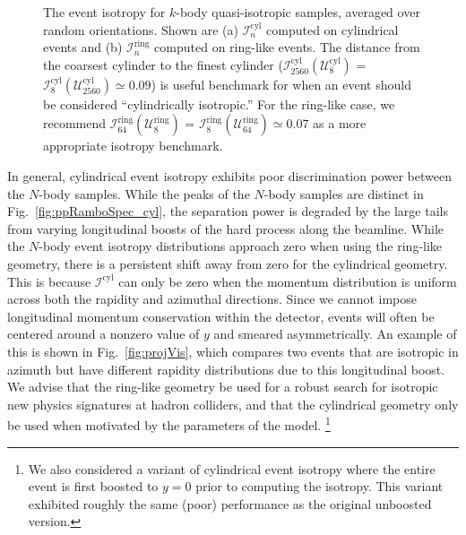 \documentclass[letterpaper,11pt]{article}
\newcommand{\iso}[2]{\mathcal{I}^\text{#1}_{#2}}
\DeclareRobustCommand{\Fig}[1]{Fig.~\ref{#1}}
\begin{document}
\begin{figure}[p]
%
\centering
     \hfill
{}
     \hfill
\caption{The event isotropy for $k$-body quasi-isotropic samples, averaged over random orientations.  Shown are (a) $\iso{cyl}{n}$ computed on cylindrical events and (b) $\iso{ring}{n}$ computed on ring-like events.
%
The distance from the coarsest cylinder to the finest cylinder ($\iso{cyl}{2560}(\mathcal{U}^\text{cyl}_{8})$ =  $\iso{cyl}{8}(\mathcal{U}^\text{cyl}_{2560}) \simeq 0.09$) is useful benchmark for when an event should be considered ``cylindrically isotropic.''
%
For the ring-like case, we recommend $\iso{ring}{64}(\mathcal{U}^\text{ring}_{8})$ =  $\iso{ring}{8}(\mathcal{U}^\text{ring}_{64}) \simeq 0.07$ as a more appropriate isotropy benchmark.
}
%
\label{fig:ppisoAUCtables}
\end{figure}


In general, cylindrical event isotropy exhibits poor discrimination power between the $N$-body samples.
%
While the peaks of the $N$-body samples are distinct in \Fig{fig:ppRamboSpec_cyl}, the separation power is degraded by the large tails from varying longitudinal boosts of the hard process along the beamline.
%
While the $N$-body event isotropy distributions approach zero when using the ring-like geometry, there is a persistent shift away from zero for the cylindrical geometry. 
%
This is because $\iso{cyl}{}$ can only be zero when the momentum distribution is uniform across both the rapidity and azimuthal directions.
%
Since we cannot impose longitudinal momentum conservation within the detector, events will often be centered around a nonzero value of $y$ and smeared asymmetrically.
%
An example of this is shown in \Fig{fig:projVis}, which compares two events that are isotropic in azimuth but have different rapidity distributions due to this longitudinal boost.
%
We advise that the ring-like geometry be used for a robust search for isotropic new physics signatures at hadron colliders, and that the cylindrical geometry only be used when motivated by the parameters of the model.%
%
\footnote{We also considered a variant of cylindrical event isotropy where the entire event is first boosted to $y = 0$ prior to computing the isotropy.
%
This variant exhibited roughly the same (poor) performance as the original unboosted version.} 
\end{document}
